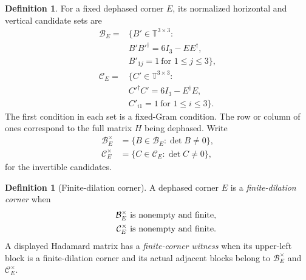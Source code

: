 \documentclass[aps,prx,reprint,nofootinbib,twoside,superscriptaddress,longbibliography,floatfix]{revtex4-2}
\theoremstyle{definition}
\newtheorem{definition}[theorem]{Definition}
\newcommand{\T}{\mathbb T}
\begin{document}
\begin{definition}
For a fixed dephased corner $E$, its normalized horizontal and vertical candidate sets are
\begin{equation}
\begin{aligned}
\mathcal B_E={}&\{B'\in\T^{3\times3}:\\
&B'B'^{\dagger}=6I_3-EE^{\dagger},\\
&B'_{1j}=1\ \text{for }1\le j\le3\},\\[2pt]
\mathcal C_E={}&\{C'\in\T^{3\times3}:\\
&C'^{\dagger}C'=6I_3-E^{\dagger}E,\\
&C'_{i1}=1\ \text{for }1\le i\le3\}.
\end{aligned}
\label{eq:candidatesets}
\end{equation}
The first condition in each set is a fixed-Gram condition. The row or column of ones correspond to the full matrix $H$ being dephased.
Write
\begin{equation}
\begin{aligned}
\mathcal B_E^\times&=\{B\in\mathcal B_E:\det B\ne0\},\\
\mathcal C_E^\times&=\{C\in\mathcal C_E:\det C\ne0\},
\end{aligned}
\label{eq:invertible-candidates}
\end{equation}
for the invertible candidates.
\end{definition}

\begin{definition}[Finite-dilation corner]
\label{def:finitecorner}
A dephased corner $E$ is a \emph{finite-dilation corner} when
\begin{align}
\mathcal B_E^\times\text{ is nonempty and finite}, \notag \\
\qquad
\mathcal C_E^\times\text{ is nonempty and finite}.
\label{eq:finite-dilation-corner}
\end{align}
A displayed Hadamard matrix has a \emph{finite-corner witness} when its upper-left block is a finite-dilation corner and its actual adjacent blocks belong to $\mathcal B_E^\times$ and $\mathcal C_E^\times$.
\end{definition}
\end{document}
